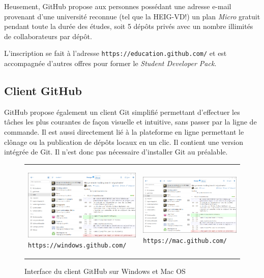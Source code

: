 \documentclass[11pt,a4paper]{article}
\begin{document}
Heusement, GitHub propose aux personnes possédant une adresse e-mail provenant d'une université reconnue (tel que la HEIG-VD!) un plan \textit{Micro} gratuit pendant toute la durée des études, soit 5 dépôts privés avec un nombre illimités de collaborateurs par dépôt.

L'inscription se fait à l'adresse {\tt https://education.github.com/} et est accompagnée d'autres offres pour former le {\it Student Developer Pack}.

\subsection{Client GitHub}

GitHub propose également un client Git simplifié permettant d'effectuer les tâches les plus courantes de façon visuelle et intuitive, sans passer par la ligne de commande.
Il est aussi directement lié à la plateforme en ligne permettant le clônage ou la publication de dépôts locaux en un clic. Il contient une version intégrée de Git. Il n'est donc pas nécessaire d'installer Git au préalable.

\begin{figure}[H]
	\center
	\begin{tabularx}{\textwidth}{XX}
		\begin{center}
			\includegraphics[width=7cm]{img_gh_win}		
			{\tt https://windows.github.com/}
			\vspace{-0.4cm}
		\end{center}
		&
		\begin{center}
			\includegraphics[width=7cm]{img_gh_win}
			{\tt https://mac.github.com/}
			\vspace{-0.4cm}
		\end{center}
	\end{tabularx}
	\caption{Interface du client GitHub sur Windows et Mac OS}
\end{figure}
\end{document}
